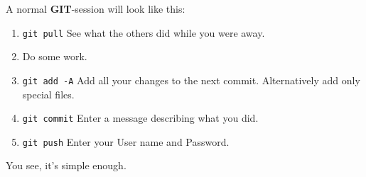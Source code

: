 \documentclass[a4paper]{article}
\newcommand{\git}{\textbf{GIT}}
\begin{document}
A normal \git -session will look like this:\\
\begin{enumerate}
	\item \texttt{git pull} See what the others did while you were away.
	\item Do some work.
	\item \texttt{git add -A} Add all your changes to the next commit. Alternatively add only special files.
	\item \texttt{git commit} Enter a message describing what you did.
	\item \texttt{git push} Enter your User name and Password.
\end{enumerate}
You see, it's simple enough.

\end{document}
